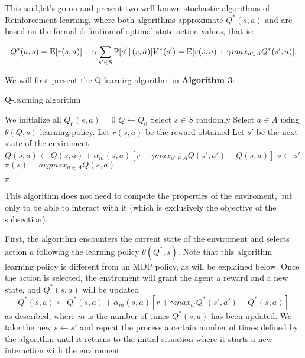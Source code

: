 \documentclass[12pt]{article}
\numberwithin{equation}{section}
\begin{document}
 
 
 This said,let's go on and present two well-known stochastic algorithms of Reinforcement learning, where both algorithms approximate  $Q^*(s,a)$ and  are based on the formal  definition of optimal state-action values, that is:

$$Q^*(a,s)=\mathbb{E}[r(s,a)]+ \gamma \sum_{s' \in S} \mathbb{P}[s' \hspace{.5mm}|\hspace{.5mm} (s,a) ]V^*(s')=\mathbb{E}[r(s,a) + \gamma max_{a \in A}Q^*(s',a)]. $$


We will first present the Q-learnirg algorithm  in {\bf Algorithm 3}:


\begin{algorithm}
\caption{Q-learning algorithm}
\begin{algorithmic}
\State We initialize all  \hspace{2mm} $Q_0(s,a)=0$
\State $Q \longleftarrow Q_0$
\State Select $s\in S$ randomly
\State Select $a \in A$ using $\theta(Q,s)$ learning policy.
\State Let  $r(s,a)$ be the reward obtained
\State Let  $s'$ be the  next state of the enviroment
\State $Q(s,a)\leftarrow Q(s,a) + \alpha_m(s,a)[r+ \gamma max_{a'\in A}Q(s',a') -Q(s,a)] $ 
\State $s \leftarrow s'$
\EndFor
\EndFor
\State $\pi(s)=argmax_{a\in A}Q(s,a)$

\Return $\pi$ 
\end{algorithmic}
\end{algorithm}





This algorithm does not need to compute the properties of the enviroment, but only to be able to interact with it (which is exclusively the objective of the subsection). 


First, the algorithm encounters the current state of the enviroment and selects action $a$ following the learning policy $\theta(Q^*,s)$. Note that this algorithm learning policy is different from an MDP policy, as will be explained below. Once the action is selected, the enviroment will grant the agent a reward and a new state, and  $Q^*(s,a)$ will be updated
$$Q^*(s,a)\leftarrow Q^*(s,a) + \alpha_m(s,a)[r+ \gamma max_{a'} Q^*(s',a') -Q^*(s,a)]$$ as described, where $m$ is the number of times $Q^*(s,a)$ has been updated. We take the new $s\leftarrow s'$ and repeat the process a certain number of times defined by the algorithm until it returns to the initial situation where it starts a new interaction with the enviroment.
\end{document}
